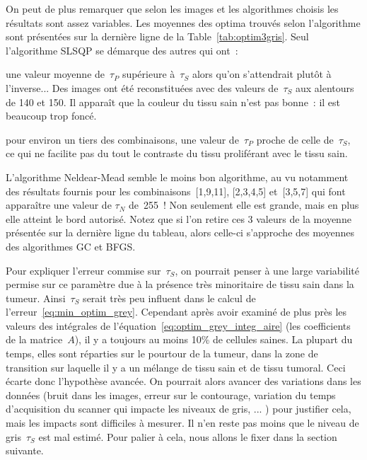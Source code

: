 \documentclass[main.tex]{subfiles}
\begin{document}
On peut de plus remarquer que selon les images et les algorithmes choisis les résultats sont assez variables. Les moyennes des optima trouvés selon l'algorithme sont présentées sur la dernière ligne de la Table~\ref{tab:optim3gris}. Seul l'algorithme SLSQP se démarque des autres qui ont~:
\begin{myitemize}
\item une valeur moyenne de~$\tau_P$ supérieure à~$\tau_S$ alors qu'on s'attendrait plutôt à l'inverse...  Des images ont été reconstituées avec des valeurs de~$\tau_S$ aux alentours de 140 et 150. Il apparaît que la couleur du tissu sain n'est pas bonne~: il est beaucoup trop foncé. 
\item pour environ un tiers des combinaisons, une valeur de~$\tau_P$ proche de celle de~$\tau_S$, ce qui ne facilite pas du tout le contraste du tissu proliférant avec le tissu sain.
\end{myitemize}
L'algorithme Neldear-Mead semble le moins bon algorithme, au vu notamment des résultats fournis pour les combinaisons~[1,9,11], [2,3,4,5] et~[3,5,7] qui font apparaître une valeur de $\tau_N$ de~255~! Non seulement elle est grande, mais en plus elle atteint le bord autorisé. Notez que si l'on retire ces 3 valeurs de la moyenne présentée sur la dernière ligne du tableau, alors celle-ci s'approche des moyennes des algorithmes GC et BFGS. 


Pour expliquer l'erreur commise sur~$\tau_S$, on pourrait penser à une large variabilité permise sur ce paramètre due à la présence très minoritaire de tissu sain dans la tumeur. Ainsi~$\tau_S$ serait très peu influent dans le calcul de l'erreur~\eqref{eq:min_optim_grey}. Cependant après avoir examiné de plus près les valeurs des intégrales de l'équation~\eqref{eq:optim_grey_integ_aire} (\ie les coefficients de la matrice~$A$), il y a toujours au moins 10\% de cellules saines. La plupart du temps, elles sont réparties sur le pourtour de la tumeur, dans la zone de transition sur laquelle il y a un mélange de tissu sain et de tissu tumoral. Ceci écarte donc l'hypothèse avancée. On pourrait alors avancer des variations dans les données (bruit dans les images, erreur sur le contourage, variation du temps d'acquisition du scanner qui impacte les niveaux de gris, ... ) pour justifier cela, mais les impacts sont difficiles à mesurer. 
Il n'en reste pas moins que le niveau de gris~$\tau_S$ est mal estimé. 
Pour palier à cela, nous allons le fixer dans la section suivante.


\end{document}
